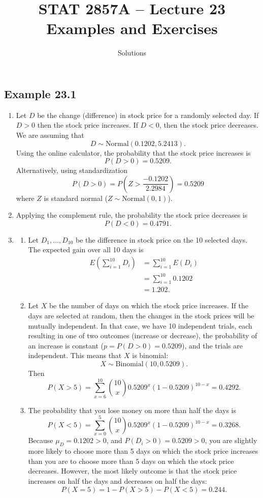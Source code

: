 \documentclass[
  letterpaper,
  DIV=11,
  numbers=noendperiod]{scrartcl}
\title{STAT 2857A -- Lecture 23 Examples and Exercises}
\subtitle{Solutions}
\author{}
\date{}
\begin{document}
\maketitle


\subsection{Example 23.1}\label{example-23.1}

\begin{enumerate}
\def\labelenumi{\alph{enumi})}
\item
  Let \(D\) be the change (difference) in stock price for a randomly
  selected day. If \(D>0\) then the stock price increases. If \(D<0\),
  then the stock price decreases. We are assuming that \[
  D \sim \mbox{Normal}(0.1202,5.2413).
  \] Using the online calculator, the probability that the stock price
  increases is \[
  P(D > 0)
  =0.5209.
  \] Alternatively, using standardization \[
  P(D > 0)
  =P\left(Z > \frac{-0.1202}{2.2984}\right)
  =0.5209
  \] where \(Z\) is standard normal (\(Z \sim \mbox{Normal}(0,1)\)).
\item
  Applying the complement rule, the probability the stock price
  decreases is \[
  P(D<0)
  =0.4791.
  \]
\item
  \begin{enumerate}
  \def\labelenumii{\roman{enumii})}
  \item
    Let \(D_1,\ldots,D_{10}\) be the difference in stock price on the 10
    selected days. The expected gain over all 10 days is \[
    \begin{aligned}
    E\left(\sum_{i=1}^{10}D_i\right)
    &=\sum_{i=1}^{10} E(D_i)\\
    &=\sum_{i=1}^{10} 0.1202\\
    &=1.202.
    \end{aligned}
    \]
  \item
    Let \(X\) be the number of days on which the stock price increases.
    If the days are selected at random, then the changes in the stock
    prices will be mutually independent. In that case, we have 10
    independent trials, each resulting in one of two outcomes (increase
    or decrease), the probability of an increase is constant
    (\(p=P(D>0)=0.5209\)), and the trials are independent. This means
    that \(X\) is binomial: \[
     X \sim \mbox{Binomial}(10,0.5209).
     \] Then \[
     P(X>5)
     =\sum_{x=6}^{10} {10 \choose x} 0.5209^x (1 - 0.5209)^{10-x}
     =0.4292.
     \]
  \item
    The probability that you lose money on more than half the days is \[
     P(X<5)
     =\sum_{x=0}^{5} {10 \choose x} 0.5209^x (1 - 0.5209)^{10-x}
     =0.3268.
     \] Because \(\mu_D=0.1202>0\), and \(P(D_i>0)=0.5209>0\), you are
    slightly more likely to choose more than 5 days on which the stock
    price increases than you are to choose more than 5 days on which the
    stock price decreases. However, the most likely outcome is that the
    stock price increases on half the days and decreases on half the
    days: \[
     P(X=5)=1-P(X>5)-P(X<5)=0.244.
     \]
  \end{enumerate}
\end{enumerate}
\end{document}
